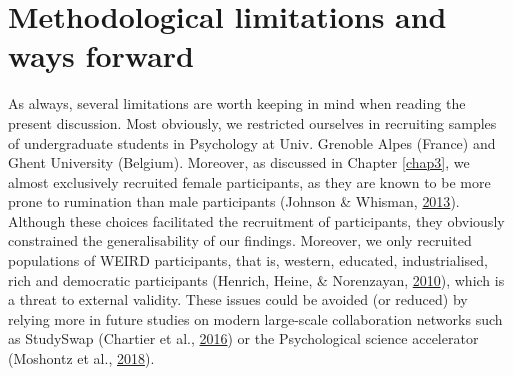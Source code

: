 \documentclass[a4paper,12pt,twoside,openright,oldfontcommands,final]{memoir}
\begin{document}
\hypertarget{methodological-limitations-and-ways-forward}{%
\section{Methodological limitations and ways forward}\label{methodological-limitations-and-ways-forward}}

As always, several limitations are worth keeping in mind when reading the present discussion. Most obviously, we restricted ourselves in recruiting samples of undergraduate students in Psychology at Univ. Grenoble Alpes (France) and Ghent University (Belgium). Moreover, as discussed in Chapter \ref{chap3}, we almost exclusively recruited female participants, as they are known to be more prone to rumination than male participants (Johnson \& Whisman, \protect\hyperlink{ref-Johnson2013}{2013}). Although these choices facilitated the recruitment of participants, they obviously constrained the generalisability of our findings. Moreover, we only recruited populations of WEIRD participants, that is, western, educated, industrialised, rich and democratic participants (Henrich, Heine, \& Norenzayan, \protect\hyperlink{ref-henrich_weirdest_2010}{2010}), which is a threat to external validity. These issues could be avoided (or reduced) by relying more in future studies on modern large-scale collaboration networks such as StudySwap (Chartier et al., \protect\hyperlink{ref-chartier_studyswap_2016}{2016}) or the Psychological science accelerator (Moshontz et al., \protect\hyperlink{ref-moshontz_psychological_2018}{2018}).
\end{document}
